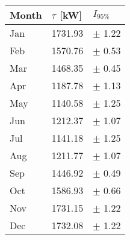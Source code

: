 \begin{tabular}{lll}
\toprule
Month & $\tau$ [kW] &  $I_{95\%}$ \\
\midrule
  Jan &     1731.93 &  $\pm$ 1.22 \\
  Feb &     1570.76 &  $\pm$ 0.53 \\
  Mar &     1468.35 &  $\pm$ 0.45 \\
  Apr &     1187.78 &  $\pm$ 1.13 \\
  May &     1140.58 &  $\pm$ 1.25 \\
  Jun &     1212.37 &  $\pm$ 1.07 \\
  Jul &     1141.18 &  $\pm$ 1.25 \\
  Aug &     1211.77 &  $\pm$ 1.07 \\
  Sep &     1446.92 &  $\pm$ 0.49 \\
  Oct &     1586.93 &  $\pm$ 0.66 \\
  Nov &     1731.15 &  $\pm$ 1.22 \\
  Dec &     1732.08 &  $\pm$ 1.22 \\
\bottomrule
\end{tabular}
